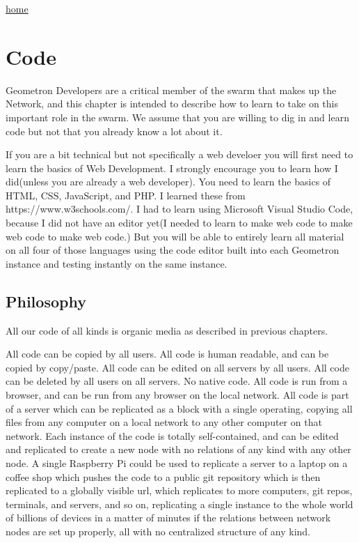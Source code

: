\href{index.html}{home}

\section{Code}\label{code}


Geometron Developers are a critical member of the swarm that makes up the Network, and this chapter is intended to describe how to learn to take on this important role in the swarm.  We assume that you are willing to dig in and learn code but not that you already know a lot about it.

If you are a bit technical but not specifically a web develoer you will first need to learn the basics of Web Development. I strongly encourage you to learn how I did(unless you are already a web developer).  You need to learn the basics of HTML, CSS, JavaScript, and PHP.  I learned these from https://www.w3schools.com/.  I had to learn using Microsoft Visual Studio Code, because I did not have an editor yet(I needed to learn to make web code to make web code to make web code.) But you will be able to entirely learn all material on all four of those languages using the code editor built into each Geometron instance and testing instantly on the same instance. 

\subsection{Philosophy}

All our code of all kinds is organic media as described in previous chapters.

All code can be copied by all users. All code is human readable, and can be copied by copy/paste.  All code can be edited on all servers by all users.  All code can be deleted by all users on all servers.  No native code.  All code is run from a browser, and can be run from any browser on the local network.  All code is part of a server which can be replicated as a block with a single operating, copying all files from any computer on a local network to any other computer on that network.  Each instance of the code is totally self-contained, and can be edited and replicated to create a new node with no relations of any kind with any other node.  A single Raspberry Pi could be used to replicate a server to a laptop on a coffee shop which pushes the code to a public git repository which is then replicated to a globally visible url, which replicates to more computers, git repos, terminals, and servers, and so on, replicating a single instance to the whole world of billions of devices in a matter of minutes if the relations between network nodes are set up properly, all with no centralized structure of any kind.  

